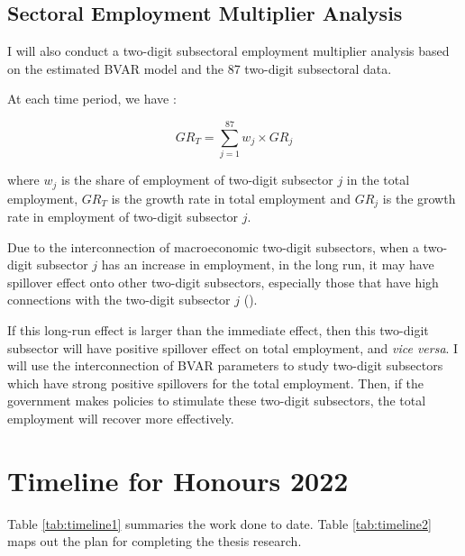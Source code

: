 \documentclass{monashthesis}
\begin{document}
\hypertarget{sectoral-employment-multiplier-analysis}{%
\section{Sectoral Employment Multiplier Analysis}\label{sectoral-employment-multiplier-analysis}}

I will also conduct a two-digit subsectoral employment multiplier analysis based on the estimated BVAR model and the 87 two-digit subsectoral data.

At each time period, we have :

\[
GR_T=\sum_{j=1}^{87} w_j\times {GR}_j
\]

where \(w_j\) is the share of employment of two-digit subsector \(j\) in the total employment, \(GR_T\) is the growth rate in total employment and \(GR_j\) is the growth rate in employment of two-digit subsector \(j\).

Due to the interconnection of macroeconomic two-digit subsectors, when a two-digit subsector \(j\) has an increase in employment, in the long run, it may have spillover effect onto other two-digit subsectors, especially those that have high connections with the two-digit subsector \(j\) (\textcite{anderson2020}).

If this long-run effect is larger than the immediate effect, then this two-digit subsector will have positive spillover effect on total employment, and \emph{vice versa}. I will use the interconnection of BVAR parameters to study two-digit subsectors which have strong positive spillovers for the total employment. Then, if the government makes policies to stimulate these two-digit subsectors, the total employment will recover more effectively.

\newpage

\hypertarget{timeline-for-honours-2022}{%
\chapter{Timeline for Honours 2022}\label{timeline-for-honours-2022}}

Table \ref{tab:timeline1} summaries the work done to date. Table \ref{tab:timeline2} maps out the plan for completing the thesis research.
\end{document}
